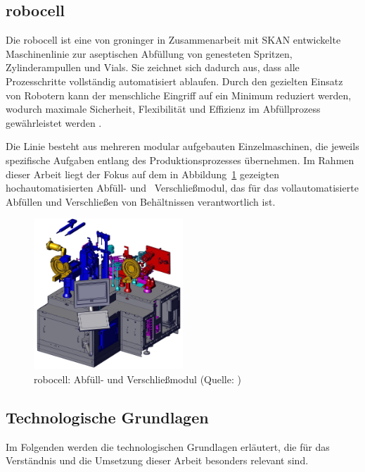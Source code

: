 \subsection{robocell}
Die robocell ist eine von groninger in Zusammenarbeit mit SKAN entwickelte Maschinenlinie zur aseptischen Abfüllung von genesteten Spritzen, Zylinderampullen und Vials.
Sie zeichnet sich dadurch aus, dass alle Prozesschritte vollständig automatisiert ablaufen.
Durch den gezielten Einsatz von Robotern kann der menschliche Eingriff auf ein Minimum reduziert werden, wodurch maximale Sicherheit, Flexibilität und Effizienz im Abfüllprozess gewährleistet werden \cite{RobocellWebsite}.

Die Linie besteht aus mehreren modular aufgebauten Einzelmaschinen, die jeweils spezifische Aufgaben entlang des Produktionsprozesses übernehmen. 
Im Rahmen dieser Arbeit liegt der Fokus auf dem in Abbildung~\ref{fig:robocell} gezeigten hochautomatisierten Abfüll- und%
\pagebreak
~Verschließmodul, das für das vollautomatisierte Abfüllen und Verschließen von Behältnissen verantwortlich ist.

\begin{figure}[htbp]
    \centering
    \includegraphics[width=0.5\textwidth]{Bilder/robocell/filling_closing_module.png}
    \caption[robocell: Abfüll- und Verschließmodul]{robocell: Abfüll- und Verschließmodul (Quelle: \cite{RobocellBetriebsanleitung})}
    \label{fig:robocell}
\end{figure}

\vspace{-0.25em}
\subsection{Technologische Grundlagen}
Im Folgenden werden die technologischen Grundlagen erläutert, die für das Verständnis und die Umsetzung dieser Arbeit besonders relevant sind.
